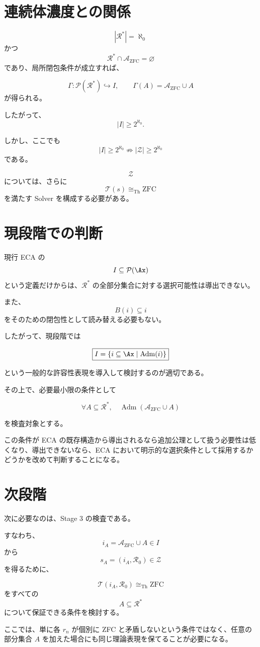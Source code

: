 \documentclass[a4paper,11pt]{ltjsarticle}
\begin{document}
\section{連続体濃度との関係}

\[
|\mathcal{R}^*|=\aleph_0
\]
かつ
\[
\mathcal{R}^*\cap\mathcal{A}_{\mathrm{ZFC}}=\varnothing
\]
であり、局所閉包条件が成立すれば、

\[
\Gamma:
\mathcal{P}(\mathcal{R}^*)\hookrightarrow I,
\qquad
\Gamma(A)=\mathcal{A}_{\mathrm{ZFC}}\cup A
\]
が得られる。

したがって、
\[
|I|\ge2^{\aleph_0}.
\]

しかし、ここでも
\[
|I|\ge2^{\aleph_0}
\not\Rightarrow
|\mathcal Z|\ge2^{\aleph_0}
\]
である。

\[
\mathcal Z
\]
については、さらに
\[
\mathcal T(s)\cong_{\mathrm{Th}}\mathrm{ZFC}
\]
を満たす Solver を構成する必要がある。

\section{現段階での判断}

現行 ECA の
\[
I\subseteq\mathcal{P}(\Ax)
\]
という定義だけからは、$\mathcal{R}^*$ の全部分集合に対する選択可能性は導出できない。

また、
\[
B(i)\subseteq i
\]
をそのための閉包性として読み替える必要もない。

したがって、現段階では

\[
\boxed{
I=\{i\subseteq\Ax\mid\operatorname{Adm}(i)\}
}
\]

という一般的な許容性表現を導入して検討するのが適切である。

その上で、必要最小限の条件として

\[
\boxed{
\forall A\subseteq\mathcal{R}^*,
\quad
\operatorname{Adm}
(\mathcal{A}_{\mathrm{ZFC}}\cup A)
}
\]

を検査対象とする。

この条件が ECA の既存構造から導出されるなら追加公理として扱う必要性は低くなり、導出できないなら、ECA において明示的な選択条件として採用するかどうかを改めて判断することになる。

\section{次段階}

次に必要なのは、Stage 3 の検査である。

すなわち、
\[
i_A=\mathcal{A}_{\mathrm{ZFC}}\cup A\in I
\]
から
\[
s_A=(i_A,\mathcal{R}_0)\in\mathcal Z
\]
を得るために、

\[
\mathcal T(i_A,\mathcal{R}_0)
\cong_{\mathrm{Th}}
\mathrm{ZFC}
\]
をすべての
\[
A\subseteq\mathcal{R}^*
\]
について保証できる条件を検討する。

ここでは、単に各 $r_n$ が個別に ZFC と矛盾しないという条件ではなく、任意の部分集合 $A$ を加えた場合にも同じ理論表現を保てることが必要になる。
\end{document}
